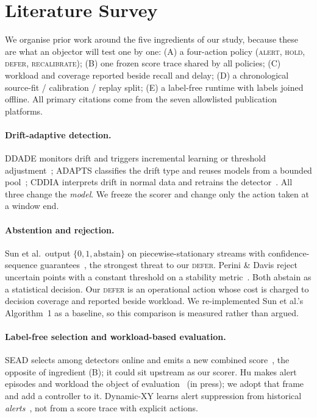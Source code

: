 \section{Literature Survey}\label{sec:literature}

We organise prior work around the five ingredients of our study, because these are
what an objector will test one by one: (A) a four-action policy (\textsc{alert},
\textsc{hold}, \textsc{defer}, \textsc{recalibrate}); (B) one frozen score trace shared by
all policies; (C) workload and coverage reported beside recall and delay; (D) a
chronological source-fit / calibration / replay split; (E) a label-free runtime with
labels joined offline. All primary citations come from the seven allowlisted
publication platforms.

\paragraph{Drift-adaptive detection.}
DDADE monitors drift and triggers incremental learning or threshold
adjustment~\citep{yang2026ddade}; ADAPTS classifies the drift type and reuses models
from a bounded pool~\citep{li2026adapts}; CDDIA interprets drift in normal data and
retrains the detector~\citep{xu2024cddia}. All three change the \emph{model}. We freeze
the scorer and change only the action taken at a window end.

\paragraph{Abstention and rejection.}
Sun et al.\ output $\{0,1,\text{abstain}\}$ on piecewise-stationary streams with
confidence-sequence guarantees~\citep{sun2024online}, the strongest threat to our
\textsc{defer}. Perini \& Davis reject uncertain points with a constant threshold on a
stability metric~\citep{perini2023rejection}. Both abstain as a statistical decision. Our
\textsc{defer} is an operational action whose cost is charged to decision coverage and
reported beside workload. We re-implemented Sun et al.'s Algorithm~1 as a baseline, so
this comparison is measured rather than argued.

\paragraph{Label-free selection and workload-based evaluation.}
SEAD selects among detectors online and emits a new combined
score~\citep{shah2025sead}, the opposite of ingredient (B); it could sit upstream as our
scorer. Hu makes alert episodes and workload the object of
evaluation~\citep{hu2026workload} (in press); we adopt that frame and add a controller
to it. Dynamic-XY learns alert suppression from historical
\emph{alerts}~\citep{bhukar2024dynamicxy}, not from a score trace with explicit actions.

